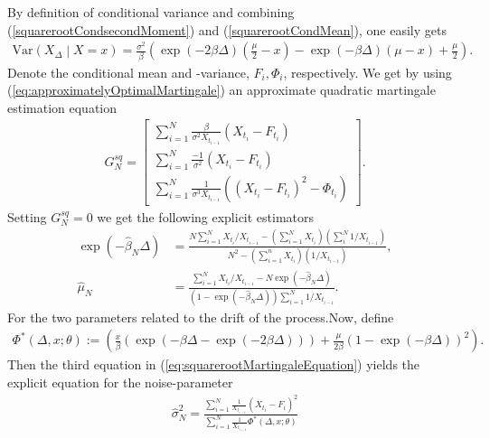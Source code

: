 By definition of conditional variance and combining (\ref{squarerootCondsecondMoment}) and (\ref{squarerootCondMean}), one easily gets
\begin{align}
    \mathrm{Var}\left(X_\Delta \middle| X = x \right) = \frac{\sigma^2}{\beta}\left(\exp\left(-2\beta\Delta\right)\left(\frac{\mu}{2} - x   \right) - \exp\left(-\beta\Delta \right)\left(\mu - x\right) + \frac{\mu}{2}\right).
\end{align}
Denote the conditional mean and -variance, $F_i, \Phi_i$, respectively. We get by using (\ref{eq:approximatelyOptimalMartingale}) an approximate quadratic martingale estimation equation
\begin{align}
        G_N^{sq} = \begin{bmatrix}
            \sum_{i = 1}^N \frac{\beta}{\sigma^2 X_{t_{i-1}}}\left(X_{t_i} - F_{t_i}\right)\\
            \sum_{i = 1}^N \frac{-1}{\sigma^2}\left(X_{t_i} - F_{t_i}\right)\\
            \sum_{i = 1}^N \frac{1}{\sigma^3 X_{t_{i-1}}}\left(\left(X_{t_i} - F_{t_i}\right)^2 - \Phi_{t_i}\right) \label{eq:squarerootMartingaleEquation}
        \end{bmatrix}.
\end{align}
Setting $G_N^{sq} = 0$ we get the following explicit estimators
\begin{align}
    \exp\left(-\hat{\beta}_N\Delta\right) &= \frac{N\sum_{i=1}^{N}X_{t_i} / X_{t_{i - 1}} - \left(\sum_{i = 1}^{N}X_{t_i}\right)\left(\sum_{i}^{N}1/X_{t_{i - 1}}\right)}{N^2 - \left(\sum_{i = 1}^{n}X_{t_i}\right)\left(1/X_{t_{i - 1}}\right)},\\
    \hat{\mu}_N &= \frac{\sum_{i = 1}^{N}X_{t_i} / X_{t_{i - 1}} - N \exp\left(-\hat{\beta}_N\Delta\right)}{\left(1-\exp\left(-\hat{\beta}_N\Delta\right)\right)\sum_{i = 1}^{N}1/X_{t_{i - 1}}}.
\end{align}
For the two parameters related to the drift of the process.Now, define
\begin{align}
    \Phi^*(\Delta, x; \theta) := \left(\frac{x}{\beta}\left(\exp\left(-\beta\Delta - \exp\left(-2\beta \Delta\right)\right)\right) + \frac{\mu}{2\beta}\left(1-\exp\left(-\beta\Delta\right)\right)^2\right).
\end{align}
Then the third equation in (\ref{eq:squarerootMartingaleEquation}) yields the explicit equation for the noise-parameter
\begin{align}
    \hat{\sigma}^2_N = \frac{\sum_{i = 1}^{N}\frac{1}{X_{t_{i - 1}}}\left(X_{t_i} - F_i\right)^2}{\sum_{i = 1}^{N}\frac{1}{X_{t_{i - 1}}}\Phi^*(\Delta, x; \theta)}
\end{align}
